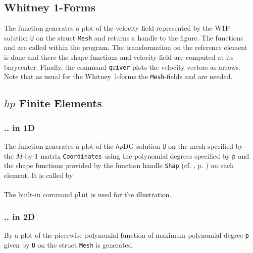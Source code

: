 
\subsection{Whitney 1-Forms} 

 The function  generates a plot of the velocity field represented by the W1F solution {\tt U} on the struct {\tt Mesh} and returns a handle to the figure. The functions  and  are called within the program. The transformation on the reference element is done and there the shape functions and velocity field are computed at its barycenter. Finally, the \MATLAB command {\tt quiver} plots the velocity vectors as arrows. \\

 Note that as usual for the Whitney 1-forms the {\tt Mesh}-fields  and \linebreak 
  are needed.



\subsection{$hp$ Finite Elements} 

\subsubsection{.. in 1D}

 The function  generates a plot of the $hp$DG solution {\tt U} on the mesh specified by the $M$-by-$1$ matrix {\tt Coordinates} using the polynomial degrees specified by {\tt p} and the shape functions provided by the function handle {\tt Shap} (cf. , p. \pageref{ssect:shap_Leg}) on each element. It is called by \\

 \\

 The built-in \MATLAB command {\tt plot} is used for the illustration.

\subsubsection{.. in 2D}

 By  a plot of the piecewise polynomial function of maximum polynomial degree {\tt p} given by {\tt U} on the struct {\tt Mesh} is generated. \\

